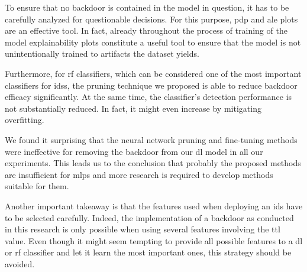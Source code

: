 \documentclass[10pt,sigconf,letterpaper,dvipsnames]{acmart}
\begin{document}
To ensure that no backdoor is contained in the model in question, it has to be carefully analyzed for questionable decisions. For this purpose, \gls{pdp} and \gls{ale} plots are an effective tool. In fact, already throughout the process of training of the model explainability plots constitute a useful tool to ensure that the model is not unintentionally trained  to artifacts the dataset yields.

Furthermore, for \gls{rf} classifiers, which can be considered one of the most important classifiers for \glspl{ids}, the pruning technique we proposed is able to reduce backdoor efficacy significantly. At the same time, the classifier's detection performance is not substantially reduced. In fact, it might even increase by mitigating overfitting.

We found it surprising that the neural network pruning and fine-tuning methods were ineffective for removing the backdoor from our \gls{dl} model in all our experiments. This leads us to the conclusion that probably the proposed methods are insufficient for \glspl{mlp} and more research is required to develop methods suitable for them.

Another important takeaway is that the features used when deploying an \gls{ids} have to be selected carefully. Indeed, the implementation of a backdoor as conducted in this research is only possible when using several features involving the \gls{ttl} value. Even though it might seem tempting to provide all possible features to a \gls{dl} or \gls{rf} classifier and let it learn the most important ones, this strategy should be avoided.

%
%
%
\end{document}
